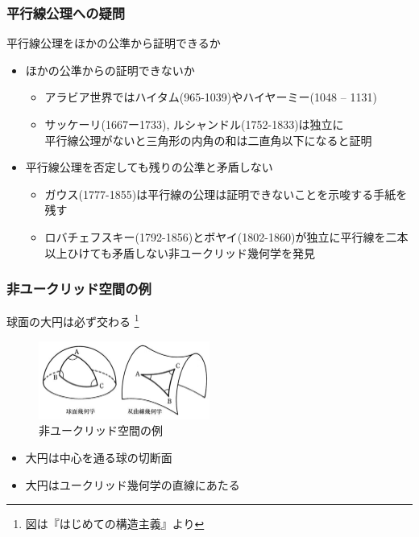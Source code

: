 \documentclass[unicode, 14pt, aspectratio=169]{beamer}
\newcommand\blfootnote[1]{%
  \begingroup
  \renewcommand\thefootnote{}\footnote{#1}%
  \addtocounter{footnote}{-1}%
  \endgroup
}
\begin{document}
\begin{frame}
  \frametitle{平行線公理への疑問}
  {\large 平行線公理をほかの公準から証明できるか}
  \begin{itemize}
  \item ほかの公準からの証明できないか
    \begin{itemize}
    \item アラビア世界ではハイタム(965-1039)やハイヤーミー(1048 – 1131)
    \item サッケーリ(1667ー1733), ルシャンドル(1752-1833)は独立に\\
      平行線公理がないと三角形の内角の和は二直角以下になると証明
    \end{itemize}
  \item 平行線公理を否定しても残りの公準と矛盾しない
    \begin{itemize}
    \item ガウス(1777-1855)は平行線の公理は証明できないことを示唆する手紙を残す
    \item ロバチェフスキー(1792-1856)とボヤイ(1802-1860)が独立に平行線を二本以上ひけても矛盾しない非ユークリッド幾何学を発見
    \end{itemize}
  \end{itemize}
\end{frame}
\begin{frame}
  \frametitle{非ユークリッド空間の例}
  {\large 球面の大円は必ず交わる}
  \blfootnote{図は『はじめての構造主義』\supercite{structure}より}
  \begin{figure}
    \includegraphics[width=0.5\textwidth]{images/non-euclid.png}
    \caption{非ユークリッド空間の例}
  \end{figure}
  \begin{itemize}
  \item 大円は中心を通る球の切断面
  \item 大円はユークリッド幾何学の直線にあたる
  \end{itemize}
\end{frame}
\end{document}
